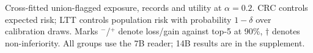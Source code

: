 \begin{table}[t]
\caption{Cross-fitted union-flagged exposure, records and utility at $\alpha=0.2$.
CRC controls expected risk; LTT controls population risk with probability
$1-\delta$ over calibration draws. Marks $^{-}$/$^{+}$ denote loss/gain
against top-5 at 90\%, $\dagger$ denotes non-inferiority. All groups use the 7B reader; 14B results are in the supplement.}
\label{tab:main}
\small
\setlength{\tabcolsep}{3.2pt}

\end{table}
